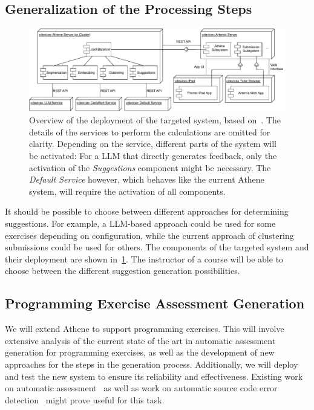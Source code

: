 \subsection*{Generalization of the Processing Steps}
\begin{figure}[ht]
    \centering
    \includegraphics[width=\linewidth]{figures/proposal/deployment.pdf}
    \caption{Overview of the deployment of the targeted system, based on~\cite{atheneLoadBalancer}. The details of the services to perform the calculations are omitted for clarity. Depending on the service, different parts of the system will be activated: For a LLM that directly generates feedback, only the activation of the \textit{Suggestions} component might be necessary. The \textit{Default Service} however, which behaves like the current Athene system, will require the activation of all components.}
    \label{fig:deployment}
\end{figure}
It should be possible to choose between different approaches for determining suggestions. For example, a LLM-based approach could be used for some exercises depending on configuration, while the current approach of clustering submissions could be used for others. The components of the targeted system and their deployment are shown in~\cref{fig:deployment}. The instructor of a course will be able to choose between the different suggestion generation possibilities.

\subsection*{Programming Exercise Assessment Generation}
We will extend Athene to support programming exercises. This will involve extensive analysis of the current state of the art in automatic assessment generation for programming exercises, as well as the development of new approaches for the steps in the generation process. Additionally, we will deploy and test the new system to ensure its reliability and effectiveness.
Existing work on automatic assessment~\cite{singh2013automated,messer2022grading} as well as work on automatic source code error detection~\cite{sourceCodeAssessment} might prove useful for this task.

